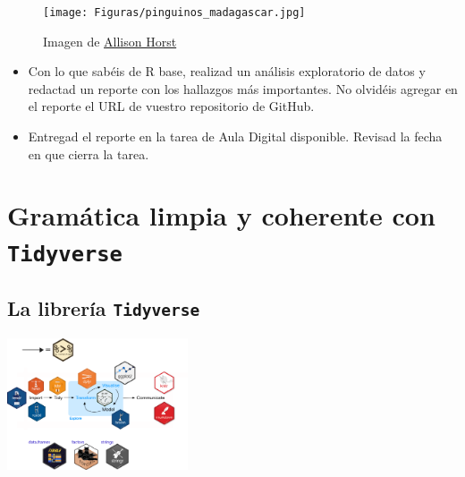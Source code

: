 \documentclass[
  letterpaper,
  DIV=11,
  numbers=noendperiod]{scrreprt}
\begin{document}
\begin{figure}[H]

{\centering \texttt{[image: Figuras/pinguinos\_madagascar.jpg]}

}

\caption{Imagen de \href{https://allisonhorst.com}{Allison Horst}}

\end{figure}%

\begin{itemize}
\item
  Con lo que sabéis de R base, realizad un análisis exploratorio de
  datos y redactad un reporte con los hallazgos más importantes. No
  olvidéis agregar en el reporte el URL de vuestro repositorio de
  GitHub.
\item
  Entregad el reporte en la tarea de Aula Digital disponible. Revisad la
  fecha en que cierra la tarea.
\end{itemize}

\section{\texorpdfstring{Gramática limpia y coherente con
\texttt{Tidyverse}}{Gramática limpia y coherente con Tidyverse}}\label{gramuxe1tica-limpia-y-coherente-con-tidyverse}

\subsection{\texorpdfstring{La librería
\texttt{Tidyverse}}{La librería Tidyverse}}\label{la-libreruxeda-tidyverse}

\begin{center}
\includegraphics[width=0.4\textwidth,height=\textheight]{Figuras/ecosistema_tidyverse.png}
\end{center}
\end{document}
